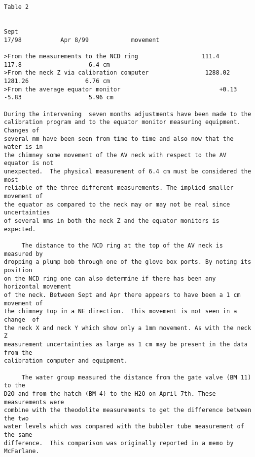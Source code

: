 \begin{verbatim}
Table 2

                                                                         Sept
17/98           Apr 8/99            movement

>From the measurements to the NCD ring                  111.4
117.8                   6.4 cm
>From the neck Z via calibration computer                1288.02
1281.26                6.76 cm
>From the average equator monitor                            +0.13
-5.83                   5.96 cm

During the intervening  seven months adjustments have been made to the
calibration program and to the equator monitor measuring equipment. Changes of
several mm have been seen from time to time and also now that the water is in
the chimney some movement of the AV neck with respect to the AV equator is not
unexpected.  The physical measurement of 6.4 cm must be considered the most
reliable of the three different measurements. The implied smaller movement of
the equator as compared to the neck may or may not be real since uncertainties
of several mms in both the neck Z and the equator monitors is expected.

     The distance to the NCD ring at the top of the AV neck is measured by
dropping a plump bob through one of the glove box ports. By noting its position
on the NCD ring one can also determine if there has been any horizontal movement
of the neck. Between Sept and Apr there appears to have been a 1 cm movement of
the chimney top in a NE direction.  This movement is not seen in a change  of
the neck X and neck Y which show only a 1mm movement. As with the neck Z
measurement uncertainties as large as 1 cm may be present in the data from the
calibration computer and equipment.

     The water group measured the distance from the gate valve (BM 11) to the
D2O and from the hatch (BM 4) to the H2O on April 7th. These measurements were
combine with the theodolite measurements to get the difference between the two
water levels which was compared with the bubbler tube measurement of the same
difference.  This comparison was originally reported in a memo by McFarlane.


\end{verbatim}
